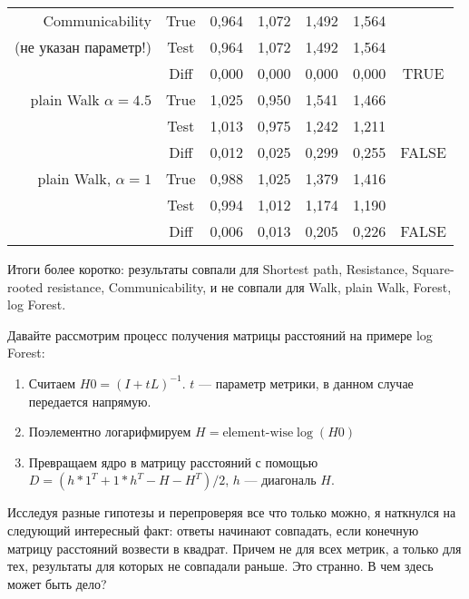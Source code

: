 \documentclass{article}
\begin{document}
\begin{table}[H]
\begin{center}
\begin{tabular}{rc|cccc|c}
                         \hline
Communicability & True & 0,964       & 1,072       & 1,492       & 1,564       &        \\
(не указан параметр!) & Test & 0,964       & 1,072       & 1,492       & 1,564       &        \\
                         & Diff & 0,000       & 0,000       & 0,000       & 0,000       & TRUE   \\
                         \hline
plain Walk $\alpha=4.5$    & True & 1,025       & 0,950       & 1,541       & 1,466       &        \\
                         & Test & 1,013       & 0,975       & 1,242       & 1,211       &        \\
                         & Diff & 0,012       & 0,025       & 0,299       & 0,255       & FALSE  \\
                         \hline
plain Walk, $\alpha=1$       & True & 0,988       & 1,025       & 1,379       & 1,416       &        \\
                         & Test & 0,994       & 1,012       & 1,174       & 1,190       &        \\
                         & Diff & 0,006       & 0,013       & 0,205       & 0,226       & FALSE  \\  
    \end{tabular}
  \end{center}
  \label{cha1:fig1natural}
\end{table}

Итоги более коротко: результаты совпали для Shortest path, Resistance, Square-rooted resistance, Communicability, и не совпали для Walk, plain Walk, Forest, log Forest.

Давайте рассмотрим процесс получения матрицы расстояний на примере log Forest:
\begin{enumerate}
  \item Считаем $H0 = (I + tL)^{-1}$. $t$ --- параметр метрики, в данном случае передается напрямую.
  \item Поэлементно логарифмируем $H = \text{element-wise} \log(H0)$
  \item Превращаем ядро в матрицу расстояний с помощью $D = (h * 1^T + 1 * h^T - H - H ^ T) / 2$, $h$ --- диагональ $H$.
\end{enumerate}

Исследуя разные гипотезы и перепроверяя все что только можно, я наткнулся на следующий интересный факт: ответы начинают совпадать, если конечную матрицу расстояний возвести в квадрат. Причем не для всех метрик, а только для тех, результаты для которых не совпадали раньше. Это странно. В чем здесь может быть дело?
\end{document}
